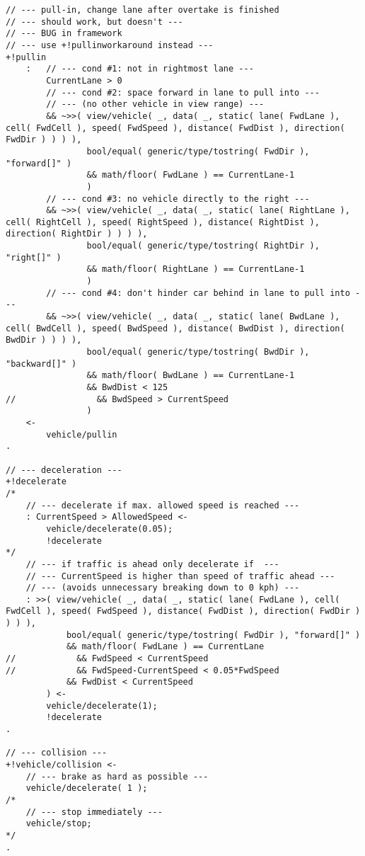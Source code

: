 \begin{lstlisting}
// --- pull-in, change lane after overtake is finished
// --- should work, but doesn't ---
// --- BUG in framework
// --- use +!pullinworkaround instead ---
+!pullin
    :   // --- cond #1: not in rightmost lane ---
        CurrentLane > 0
        // --- cond #2: space forward in lane to pull into ---
        // --- (no other vehicle in view range) ---
        && ~>>( view/vehicle( _, data( _, static( lane( FwdLane ), cell( FwdCell ), speed( FwdSpeed ), distance( FwdDist ), direction( FwdDir ) ) ) ),
                bool/equal( generic/type/tostring( FwdDir ), "forward[]" ) 
                && math/floor( FwdLane ) == CurrentLane-1
                )
        // --- cond #3: no vehicle directly to the right ---
        && ~>>( view/vehicle( _, data( _, static( lane( RightLane ), cell( RightCell ), speed( RightSpeed ), distance( RightDist ), direction( RightDir ) ) ) ),
                bool/equal( generic/type/tostring( RightDir ), "right[]" ) 
                && math/floor( RightLane ) == CurrentLane-1
                )
        // --- cond #4: don't hinder car behind in lane to pull into ---
        && ~>>( view/vehicle( _, data( _, static( lane( BwdLane ), cell( BwdCell ), speed( BwdSpeed ), distance( BwdDist ), direction( BwdDir ) ) ) ),
                bool/equal( generic/type/tostring( BwdDir ), "backward[]" ) 
                && math/floor( BwdLane ) == CurrentLane-1
                && BwdDist < 125
//                && BwdSpeed > CurrentSpeed 
                )
    <-
        vehicle/pullin
.

// --- deceleration ---
+!decelerate 
/*
    // --- decelerate if max. allowed speed is reached ---
    : CurrentSpeed > AllowedSpeed <-
        vehicle/decelerate(0.05);
        !decelerate
*/
    // --- if traffic is ahead only decelerate if  ---
    // --- CurrentSpeed is higher than speed of traffic ahead ---
    // --- (avoids unnecessary breaking down to 0 kph) ---
    : >>( view/vehicle( _, data( _, static( lane( FwdLane ), cell( FwdCell ), speed( FwdSpeed ), distance( FwdDist ), direction( FwdDir ) ) ) ), 
            bool/equal( generic/type/tostring( FwdDir ), "forward[]" ) 
            && math/floor( FwdLane ) == CurrentLane
//            && FwdSpeed < CurrentSpeed
//            && FwdSpeed-CurrentSpeed < 0.05*FwdSpeed
            && FwdDist < CurrentSpeed
        ) <-
        vehicle/decelerate(1);
        !decelerate
.

// --- collision ---
+!vehicle/collision <-
    // --- brake as hard as possible ---
    vehicle/decelerate( 1 );
/*
    // --- stop immediately ---
    vehicle/stop;
*/
.
\end{lstlisting}


